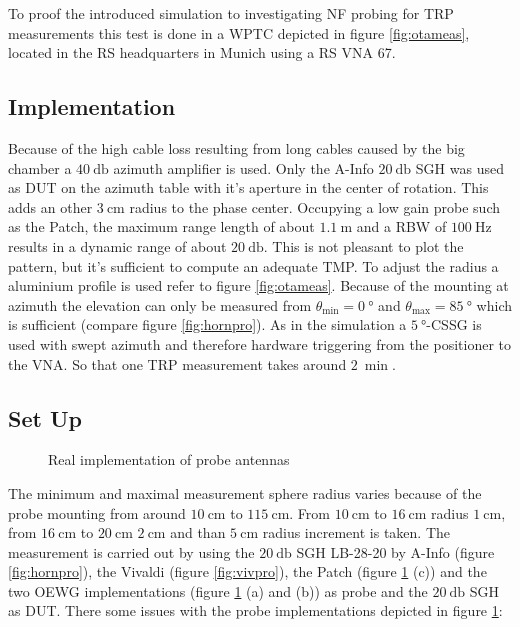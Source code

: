 To proof the introduced simulation to investigating \ac{NF} probing for \ac{TRP} measurements this test is done in a \ac{WPTC} depicted in figure \ref{fig:otameas}, located in the \ac{RS} headquarters in Munich using a \ac{RS} \ac{VNA} 67.

\subsection{Implementation}

 Because of the high cable loss resulting from long cables caused by the big chamber a $\SI{40}{\decibel}$ azimuth amplifier is used. Only the A-Info $\SI{20}{\decibel}$ \ac{SGH} was used as \ac{DUT} on the azimuth table with it's aperture in the center of rotation. This adds an other $\SI{3}{\centi\meter}$ radius to the phase center. Occupying a low gain probe such as the Patch, the maximum range length of about $\SI{1.1}{\meter}$ and a \ac{RBW} of $\SI{100}{\hertz}$ results in a dynamic range of about $\SI{20}{\decibel}$. This is not pleasant to plot the pattern, but it's sufficient to compute an adequate \ac{TMP}. To adjust the radius a aluminium profile is used refer to figure \ref{fig:otameas}. Because of the mounting at azimuth the elevation can only be measured from $\theta_\text{min}=\SI{0}{\degree}$ and $\theta_\text{max}=\SI{85}{\degree}$ which is sufficient (compare figure \ref{fig:hornpro}). As in the simulation a $\SI{5}{\degree}$-\ac{CSSG} is used with swept azimuth and therefore hardware triggering from the positioner to the \ac{VNA}. So that one \ac{TRP} measurement takes around $\SI{2}{\min}$.

\subsection{Set Up}

\begin{figure}[h]
  \centering
  \centering
  \centering
\caption{Real implementation of probe antennas}
\label{fig:realprobe}
\end{figure}

The minimum and maximal measurement sphere radius varies because of the probe mounting from around $\SI{10}{\centi\meter}$ to $\SI{115}{\centi\meter}$. From $\SI{10}{\centi\meter}$ to $\SI{16}{\centi\meter}$ radius $\SI{1}{\centi\meter}$, from $\SI{16}{\centi\meter}$ to $\SI{20}{\centi\meter}$ $\SI{2}{\centi\meter}$ and than $\SI{5}{\centi\meter}$ radius increment is taken. The measurement is carried out by using the $\SI{20}{\decibel}$ \ac{SGH} LB-28-20 by A-Info (figure \ref{fig:hornpro}), the Vivaldi (figure \ref{fig:vivpro}), the Patch (figure \ref{fig:realprobe} (c)) and the two \ac{OEWG} implementations (figure \ref{fig:realprobe} (a) and (b)) as probe and the $\SI{20}{\decibel}$ \ac{SGH} as \ac{DUT}. There some issues with the probe implementations depicted in figure \ref{fig:realprobe}:

